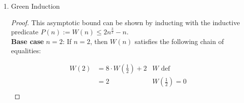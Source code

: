 \documentclass[10pt]{article}
\begin{document}
\begin{enumerate}[label={}]
\begin{proof}
                  $$
                        \begin{aligned}
                              \sum_{r=0}^{\log _4 (n)-1} 8^r \cdot \frac{n}{4^r} & =n \cdot \sum_{r=0}^{\log _4 (n)-1}\left(\frac{8^r}{4^r}\right) \\
                                                                                 & =n \cdot \sum_{r=0}^{\log _4 (n)-1} 2^r                         \\
                                                                                 & =n\left(\frac{2^{\log _4 (n)}-1}{2-1}\right)                    \\
                                                                                 & =n\left(n^{\log _4 (2)}-1\right)                                \\
                                                                                 & =n\left(n^{\frac{\log _2 2}{\log _2 4}}-1\right)                \\
                                                                                 & =n\left(n^{\frac{1}{2}}-1\right)                                \\
                                                                                 & =n^{\frac{3}{2}}-n
                        \end{aligned}
                  $$


                  Since the total work $n^{\frac{3}{2}}-n$ is always less than or equal to $n^{\frac{3}{2}}$ for $n \geq 1$, it follows that $W(n)=n^{\frac{3}{2}}-n \in O\left(n^{\frac{3}{2}}\right)$.

            \end{proof}

            \newpage

      \item Green Induction
            \begin{proof}
                  This asymptotic bound can be shown by inducting with the inductive predicate $P(n):=W(n) \leq 2n^{\frac{3}{2}} - n$.\\

                  \textbf{Base case} $n=2$: If $n=2$, then $W(n)$ satisfies the following chain of equalities:

                  $$
                        \begin{array}{rlrl}
                              W(2) & =8 \cdot W(\frac{1}{2})+2 & W \text { def }    \\
                                   & =2                        & W(\frac{1}{2}) = 0 \\
                        \end{array}
                  $$



\end{proof}
\end{enumerate}
\end{document}
